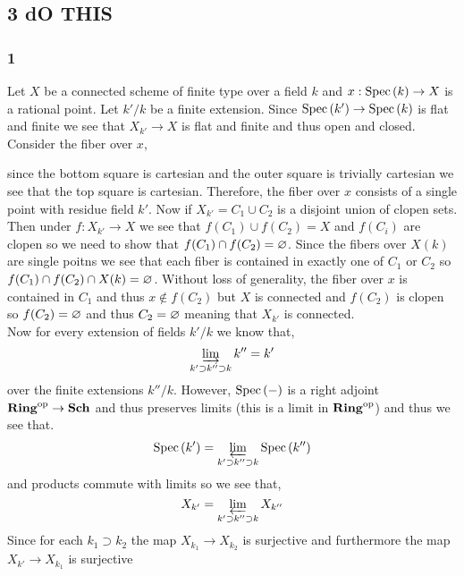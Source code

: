\documentclass[12pt]{article}
\begin{document}
\subsection{3 dO THIS}

\subsubsection{1}

Let $X$ be a connected scheme of finite type over a field $k$ and $x : \mathrm{Spec}\left( k \right) \to X$ is a rational point. Let $k' / k$ be a finite extension. Since $\mathrm{Spec}\left( k' \right) \to \mathrm{Spec}\left( k \right)$ is flat and finite we see that $X_{k'} \to X$ is flat and finite and thus open and closed. Consider the fiber over $x$,
\begin{center}
\end{center}
since the bottom square is cartesian and the outer square is trivially cartesian we see that the top square is cartesian. Therefore, the fiber over $x$ consists of a single point with residue field $k'$. Now if $X_{k'} = C_1 \cup C_2$ is a disjoint union of clopen sets. Then under $f : X_{k'} \to X$ we see that $f(C_1) \cup f(C_2) = X$ and $f(C_i)$ are clopen so we need to show that $f(C_1) \cap f(C_2) = \varnothing$. Since the fibers over $X(k)$ are single poitns we see that each fiber is contained in exactly one of $C_1$ or $C_2$ so $f(C_1) \cap f(C_2) \cap X(k) = \varnothing$. Without loss of generality, the fiber over $x$ is contained in $C_1$ and thus $x \notin f(C_2)$ but $X$ is connected and $f(C_2)$ is clopen so $f(C_2) = \varnothing$ and thus $C_2 = \varnothing$ meaning that $X_{k'}$ is connected.
\bigskip\\
Now for every extension of fields $k' / k$ we know that,
\[ \varinjlim_{k' \supset k'' \supset k} k''  = k' \]
over the finite extensions $k'' / k$. However, $\mathrm{Spec}\left( - \right)$ is a right adjoint $\mathbf{Ring}^{\mathrm{op}} \to \mathbf{Sch}$ and thus preserves limits (this is a limit in $\mathbf{Ring}^{\mathrm{op}}$) and thus we see that.
\[ \mathrm{Spec}\left( k' \right) = \varprojlim_{k' \supset k'' \supset k} \mathrm{Spec}\left( k'' \right) \]
and products commute with limits so we see that,
\[ X_{k'} = \varprojlim_{k' \supset k'' \supset k} X_{k''} \]
Since for each $k_1 \supset k_2$ the map $X_{k_1} \to X_{k_2}$ is surjective and furthermore the map $X_{k'} \to X_{k_1}$ is surjective  
\end{document}
